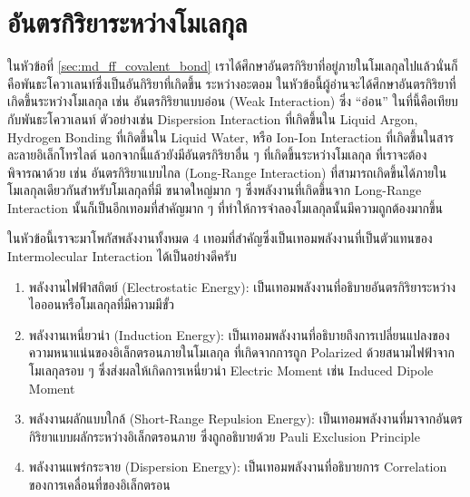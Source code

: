 \section{อันตรกิริยาระหว่างโมเลกุล}

ในหัวข้อที่ \ref{sec:md_ff_covalent_bond} เราได้ศึกษาอันตรกิริยาที่อยู่ภายในโมเลกุลไปแล้วนั่นก็คือพันธะโควาเลนท์ซึ่งเป็นอันกิริยาที่เกิดขึ้น%
ระหว่างอะตอม ในหัวข้อนี้ผู้อ่านจะได้ศึกษาอันตรกิริยาที่เกิดขึ้นระหว่างโมเลกุล เช่น อันตรกิริยาแบบอ่อน (Weak Interaction) ซึ่ง \enquote{อ่อน}
ในที่นี้คือเทียบกับพันธะโควาเลนท์ ตัวอย่างเช่น Dispersion Interaction ที่เกิดขึ้นใน Liquid Argon, Hydrogen Bonding ที่เกิดขึ้นใน
Liquid Water, หรือ Ion-Ion Interaction ที่เกิดขึ้นในสารละลายอิเล็กโทรไลต์ นอกจากนี้แล้วยังมีอันตรกิริยาอื่น ๆ ที่เกิดขึ้นระหว่างโมเลกุล%
ที่เราจะต้องพิจารณาด้วย เช่น อันตรกิริยาแบบไกล (Long-Range Interaction) ที่สามารถเกิดขึ้นได้ภายในโมเลกุลเดียวกันสำหรับโมเลกุลที่มี%
ขนาดใหญ่มาก ๆ ซึ่งพลังงานที่เกิดขึ้นจาก Long-Range Interaction นั้นก็เป็นอีกเทอมที่สำคัญมาก ๆ ที่ทำให้การจำลองโมเลกุลนั้นมีความถูกต้องมากขึ้น

ในหัวข้อนี้เราจะมาโพกัสพลังงานทั้งหมด 4 เทอมที่สำคัญซึ่งเป็นเทอมพลังงานที่เป็นตัวแทนของ Intermolecular Interaction ได้เป็นอย่างดีครับ

\begin{enumerate}[topsep=0pt,noitemsep]
  \setlength\itemsep{1em}
  \item พลังงานไฟฟ้าสถิตย์ (Electrostatic Energy): เป็นเทอมพลังงานที่อธิบายอันตรกิริยาระหว่างไอออนหรือโมเลกุลที่มีความมีขั้ว

  \item พลังงานเหนี่ยวนำ (Induction Energy): เป็นเทอมพลังงานที่อธิบายถึงการเปลี่ยนแปลงของความหนาแน่นของอิเล็กตรอนภายในโมเลกุล%
        ที่เกิดจากการถูก Polarized ด้วยสนามไฟฟ้าจากโมเลกุลรอบ ๆ ซึ่งส่งผลให้เกิดการเหนี่ยวนำ Electric Moment เช่น Induced Dipole
        Moment

  \item พลังงานผลักแบบใกล้ (Short-Range Repulsion Energy): เป็นเทอมพลังงานที่มาจากอันตรกิริยาแบบผลักระหว่างอิเล็กตรอนภาย%
        ซึ่งถูกอธิบายด้วย Pauli Exclusion Principle

  \item พลังงานแพร่กระจาย (Dispersion Energy): เป็นเทอมพลังงานที่อธิบายการ Correlation ของการเคลื่อนที่ของอิเล็กตรอน
\end{enumerate}

